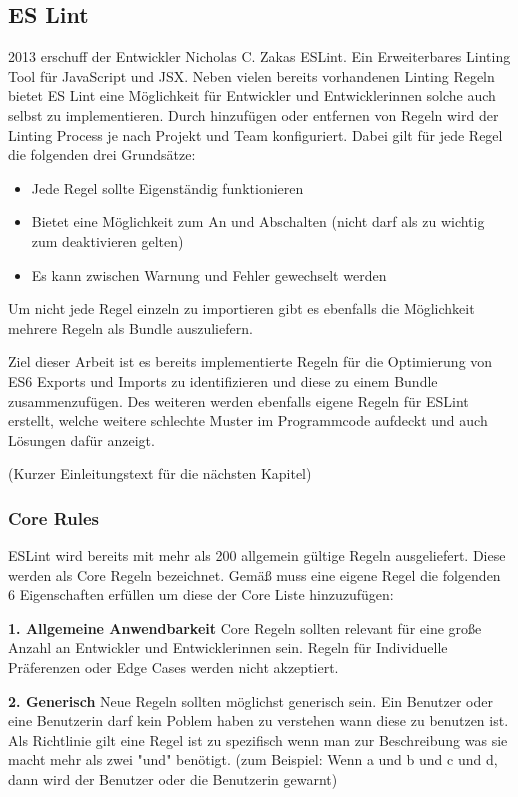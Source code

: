 \subsection{ES Lint}
2013 erschuff der Entwickler Nicholas C. Zakas ESLint. Ein Erweiterbares Linting Tool für JavaScript und JSX. Neben vielen bereits vorhandenen Linting Regeln bietet  ES Lint eine Möglichkeit für Entwickler und Entwicklerinnen solche auch selbst zu implementieren. Durch hinzufügen oder entfernen von Regeln wird der Linting Process je nach Projekt und Team konfiguriert. Dabei gilt für jede Regel die folgenden drei Grundsätze:
\begin{itemize}
  \item Jede Regel sollte Eigenständig funktionieren
  \item Bietet eine Möglichkeit zum An und Abschalten (nicht darf als zu wichtig zum deaktivieren gelten)
  \item Es kann zwischen Warnung und Fehler gewechselt werden
\end{itemize}
Um nicht jede Regel einzeln zu importieren gibt es ebenfalls die Möglichkeit mehrere Regeln als Bundle auszuliefern. \autocite{ESLintAbout}

Ziel dieser Arbeit ist es bereits implementierte Regeln für die Optimierung von ES6 Exports und Imports zu identifizieren und diese zu einem Bundle zusammenzufügen. Des weiteren werden ebenfalls eigene Regeln für ESLint erstellt, welche weitere schlechte Muster im Programmcode aufdeckt und auch Lösungen dafür anzeigt. \autocite{ESLintAbout}

(Kurzer Einleitungstext für die nächsten Kapitel)

\subsubsection{Core Rules}
\label{subsubsection:core_rules}

ESLint wird bereits mit mehr als 200 allgemein gültige Regeln ausgeliefert. Diese werden als Core Regeln bezeichnet. Gemäß \autocite{ESLintNewRules} muss eine eigene Regel die folgenden 6 Eigenschaften erfüllen um diese der Core Liste hinzuzufügen:


\textbf{1. Allgemeine Anwendbarkeit}
Core Regeln sollten relevant für eine große Anzahl an Entwickler und Entwicklerinnen sein. Regeln für Individuelle Präferenzen oder Edge Cases werden nicht akzeptiert.

\textbf{2. Generisch}
Neue Regeln sollten möglichst generisch sein. Ein Benutzer oder eine Benutzerin darf kein Poblem haben zu verstehen wann diese zu benutzen ist. Als Richtlinie gilt eine Regel ist zu spezifisch wenn man zur Beschreibung was sie macht mehr als zwei "und" benötigt. (zum Beispiel: Wenn a und b und c und d, dann wird der Benutzer oder die Benutzerin gewarnt)

